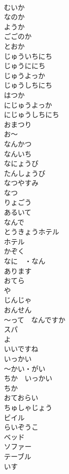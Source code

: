 \documentclass[8pt]{extreport}
\begin{document}
\begin{CJK}{UTF8}{min}
\\	むいか		
\\	なのか		
\\	ようか		
\\	ごごのか		
\\	とおか		
\\	じゅういちにち		
\\	じゅうににち		
\\	じゅうよっか		
\\	じゅうしちにち		
\\	はつか		
\\	にじゅうよっか		
\\	にじゅうしちにち		
\\	おまつり		
\\	お〜		
\\	なんかつ		
\\	なんいち		
\\	なにょうび		
\\	たんしょうび		
\\	なつやすみ		
\\	なつ		
\\	りょごう		
\\	あるいて		
\\	なんで		
\\	とうきょうホテル		
\\	ホテル		
\\	かぞく		
\\	なに　・なん		
\\	あります		
\\	おてら		
\\	や		
\\	じんじゃ		
\\	おんせん		
\\	〜って　なんですか		
\\	スパ		
\\	よ		
\\	いいですね		
\\	いっかい		
\\	〜かい・がい		
\\	ちか　いっかい		
\\	ちか		
\\	おておらい		
\\	ちゅしゃじょう		
\\	ビイル		
\\	らいぞうこ		
\\	ベッド		
\\	ソファー		
\\	テーブル		
\\	いす		

\end{CJK}
\end{document}
